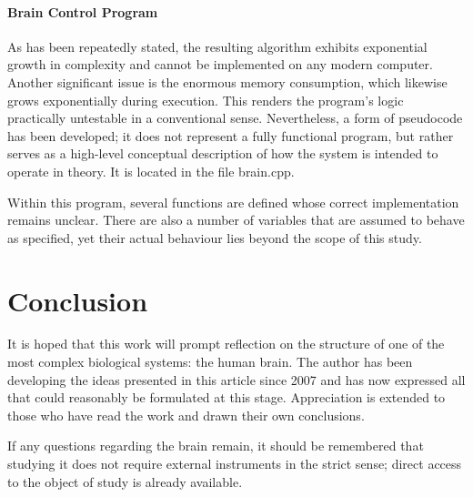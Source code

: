 \documentclass[12pt, a4paper]{article}
\begin{document}
\paragraph{Brain Control Program}

As has been repeatedly stated, the resulting algorithm exhibits exponential growth 
in complexity and cannot be implemented on any modern computer. Another significant 
issue is the enormous memory consumption, which likewise grows exponentially during 
execution. This renders the program’s logic practically untestable in a conventional 
sense. Nevertheless, a form of pseudocode has been developed; it does not represent a 
fully functional program, but rather serves as a high-level conceptual description of how 
the system is intended to operate in theory. It is located in the file brain.cpp.

Within this program, several functions are defined whose correct implementation remains 
unclear. There are also a number of variables that are assumed to behave as specified, 
yet their actual behaviour lies beyond the scope of this study.

\section{Conclusion}

It is hoped that this work will prompt reflection on the structure of one of the most 
complex biological systems: the human brain. The author has been developing the ideas 
presented in this article since 2007 and has now expressed all that could reasonably be 
formulated at this stage. Appreciation is extended to those who have read the work and 
drawn their own conclusions.

If any questions regarding the brain remain, it should be remembered that studying it does 
not require external instruments in the strict sense; direct access to the object of study 
is already available.


 
 
\nocite{*}
\end{document}
